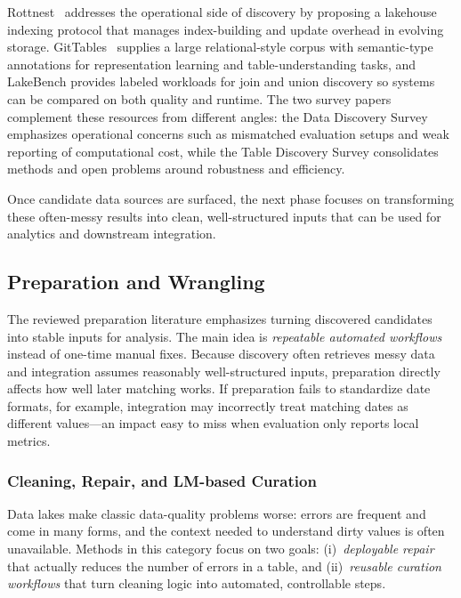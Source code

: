 \documentclass[sigconf]{acmart}
\begin{document}
Rottnest~\cite{11113229} addresses the operational side of discovery by proposing a lakehouse indexing protocol that manages index-building and update overhead in evolving storage. GitTables~\cite{10.1145/3588710} supplies a large relational-style corpus with semantic-type annotations for representation learning and table-understanding tasks, and LakeBench provides labeled workloads for join and union discovery so systems can be compared on both quality and runtime. The two survey papers complement these resources from different angles: the Data Discovery Survey emphasizes operational concerns such as mismatched evaluation setups and weak reporting of computational cost, while the Table Discovery Survey consolidates methods and open problems around robustness and efficiency.

Once candidate data sources are surfaced, the next phase focuses on transforming these often-messy results into clean, well-structured inputs that can be used for analytics and downstream integration.


\subsection{Preparation and Wrangling}

The reviewed preparation literature emphasizes turning discovered candidates into stable inputs for analysis. The main idea is \emph{repeatable automated workflows} instead of one-time manual fixes. Because discovery often retrieves messy data and integration assumes reasonably well-structured inputs, preparation directly affects how well later matching works. If preparation fails to standardize date formats, for example, integration may incorrectly treat matching dates as different values---an impact easy to miss when evaluation only reports local metrics.



\subsubsection{Cleaning, Repair, and LM-based Curation}
Data lakes make classic data-quality problems worse: errors are frequent and come in many forms, and the context needed to understand dirty values is often unavailable. Methods in this category focus on two goals: (i)~\emph{deployable repair} that actually reduces the number of errors in a table, and (ii)~\emph{reusable curation workflows} that turn cleaning logic into automated, controllable steps.
\end{document}
